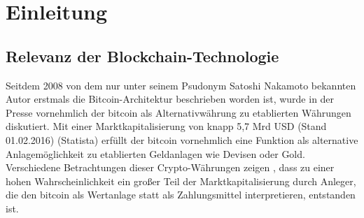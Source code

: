 
\chapter{Einleitung}
\label{chapter_einleitung}


\section{Relevanz der \gls{Blockchain}-Technologie}
Seitdem 2008 von dem nur unter seinem Psudonym Satoshi Nakamoto bekannten Autor erstmals die \gls{Bitcoin}-Architektur beschrieben worden ist, wurde in der Presse vornehmlich der \gls{bitcoin} als Alternativwährung zu etablierten Währungen diskutiert. Mit einer Marktkapitalisierung von knapp 5,7 Mrd USD (Stand 01.02.2016) (Statista) 
erfüllt der \gls{bitcoin} vornehmlich eine Funktion als alternative Anlagemöglichkeit zu etablierten Geldanlagen wie Devisen oder Gold. Verschiedene Betrachtungen dieser Crypto-Währungen zeigen , dass zu einer hohen Wahrscheinlichkeit ein großer Teil der Marktkapitalisierung durch Anleger, die den \gls{bitcoin} als Wertanlage statt als Zahlungsmittel interpretieren, entstanden ist.  \\


